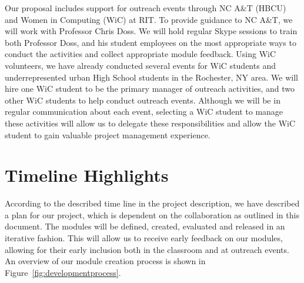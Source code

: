 \documentclass[11pt]{article}
\begin{document}
Our proposal includes support for outreach events through NC A\&T (HBCU) and Women in Computing (WiC) at RIT. To provide guidance to NC A\&T, we will work with Professor Chris Doss. We will hold regular Skype sessions to train both Professor Doss, and his student employees on the most appropriate ways to conduct the activities and collect appropriate module feedback. Using WiC volunteers, we have already conducted several events for WiC students and underrepresented urban High School students in the Rochester, NY area. We will hire one WiC student to be the primary manager of outreach activities, and two other WiC students to help conduct outreach events. Although we will be in regular communication about each event, selecting a WiC student to manage these activities will allow us to delegate these responsibilities and allow the WiC student to gain valuable project management experience.


\section{Timeline Highlights}



According to the described time line in the project description, we have described a plan for our project, which is dependent on the collaboration as outlined in this document. The modules will be defined, created, evaluated and released in an iterative fashion. This will allow us to receive early feedback on our modules, allowing for their early inclusion both in the classroom and at outreach events. An overview of our module creation process is shown in Figure~\ref{fig:developmentprocess}.

\end{document}
